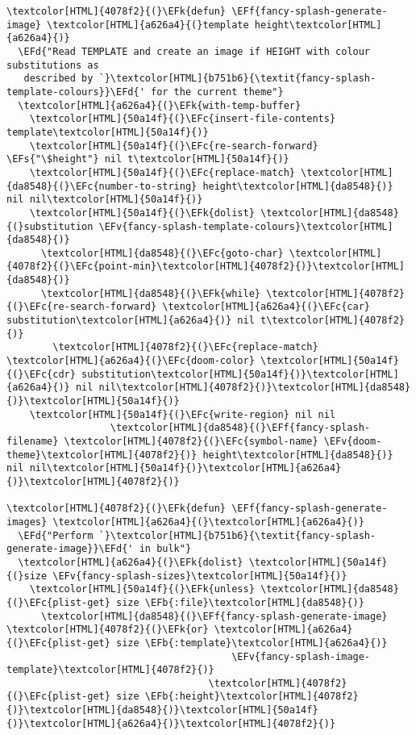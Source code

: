 \documentclass{scrartcl}
\newcommand{\EFk}[1]{\textcolor{EFk}{#1}} %
\newcommand{\EFd}[1]{\textcolor{EFd}{\textit{#1}}} %
\newcommand{\EFs}[1]{\textcolor{EFs}{#1}} %
\newcommand{\EFb}[1]{\textcolor{EFb}{#1}} %
\newcommand{\EFc}[1]{\textcolor{EFc}{#1}} %
\newcommand{\EFv}[1]{\textcolor{EFv}{#1}} %
\newcommand{\EFf}[1]{\textcolor{EFf}{#1}} %
\begin{document}
\begin{Code}
\begin{Verbatim}[]
\textcolor[HTML]{4078f2}{(}\EFk{defun} \EFf{fancy-splash-generate-image} \textcolor[HTML]{a626a4}{(}template height\textcolor[HTML]{a626a4}{)}
  \EFd{"Read TEMPLATE and create an image if HEIGHT with colour substitutions as
   described by `}\textcolor[HTML]{b751b6}{\textit{fancy-splash-template-colours}}\EFd{' for the current theme"}
  \textcolor[HTML]{a626a4}{(}\EFk{with-temp-buffer}
    \textcolor[HTML]{50a14f}{(}\EFc{insert-file-contents} template\textcolor[HTML]{50a14f}{)}
    \textcolor[HTML]{50a14f}{(}\EFc{re-search-forward} \EFs{"\$height"} nil t\textcolor[HTML]{50a14f}{)}
    \textcolor[HTML]{50a14f}{(}\EFc{replace-match} \textcolor[HTML]{da8548}{(}\EFc{number-to-string} height\textcolor[HTML]{da8548}{)} nil nil\textcolor[HTML]{50a14f}{)}
    \textcolor[HTML]{50a14f}{(}\EFk{dolist} \textcolor[HTML]{da8548}{(}substitution \EFv{fancy-splash-template-colours}\textcolor[HTML]{da8548}{)}
      \textcolor[HTML]{da8548}{(}\EFc{goto-char} \textcolor[HTML]{4078f2}{(}\EFc{point-min}\textcolor[HTML]{4078f2}{)}\textcolor[HTML]{da8548}{)}
      \textcolor[HTML]{da8548}{(}\EFk{while} \textcolor[HTML]{4078f2}{(}\EFc{re-search-forward} \textcolor[HTML]{a626a4}{(}\EFc{car} substitution\textcolor[HTML]{a626a4}{)} nil t\textcolor[HTML]{4078f2}{)}
        \textcolor[HTML]{4078f2}{(}\EFc{replace-match} \textcolor[HTML]{a626a4}{(}\EFc{doom-color} \textcolor[HTML]{50a14f}{(}\EFc{cdr} substitution\textcolor[HTML]{50a14f}{)}\textcolor[HTML]{a626a4}{)} nil nil\textcolor[HTML]{4078f2}{)}\textcolor[HTML]{da8548}{)}\textcolor[HTML]{50a14f}{)}
    \textcolor[HTML]{50a14f}{(}\EFc{write-region} nil nil
                  \textcolor[HTML]{da8548}{(}\EFf{fancy-splash-filename} \textcolor[HTML]{4078f2}{(}\EFc{symbol-name} \EFv{doom-theme}\textcolor[HTML]{4078f2}{)} height\textcolor[HTML]{da8548}{)} nil nil\textcolor[HTML]{50a14f}{)}\textcolor[HTML]{a626a4}{)}\textcolor[HTML]{4078f2}{)}

\textcolor[HTML]{4078f2}{(}\EFk{defun} \EFf{fancy-splash-generate-images} \textcolor[HTML]{a626a4}{(}\textcolor[HTML]{a626a4}{)}
  \EFd{"Perform `}\textcolor[HTML]{b751b6}{\textit{fancy-splash-generate-image}}\EFd{' in bulk"}
  \textcolor[HTML]{a626a4}{(}\EFk{dolist} \textcolor[HTML]{50a14f}{(}size \EFv{fancy-splash-sizes}\textcolor[HTML]{50a14f}{)}
    \textcolor[HTML]{50a14f}{(}\EFk{unless} \textcolor[HTML]{da8548}{(}\EFc{plist-get} size \EFb{:file}\textcolor[HTML]{da8548}{)}
      \textcolor[HTML]{da8548}{(}\EFf{fancy-splash-generate-image} \textcolor[HTML]{4078f2}{(}\EFk{or} \textcolor[HTML]{a626a4}{(}\EFc{plist-get} size \EFb{:template}\textcolor[HTML]{a626a4}{)}
                                       \EFv{fancy-splash-image-template}\textcolor[HTML]{4078f2}{)}
                                   \textcolor[HTML]{4078f2}{(}\EFc{plist-get} size \EFb{:height}\textcolor[HTML]{4078f2}{)}\textcolor[HTML]{da8548}{)}\textcolor[HTML]{50a14f}{)}\textcolor[HTML]{a626a4}{)}\textcolor[HTML]{4078f2}{)}


\end{Verbatim}
\end{Code}
\end{document}
